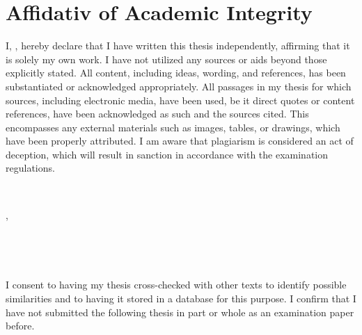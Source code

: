 \chapter*{Affidativ of Academic Integrity}
I, \insertauthor, hereby declare that I have written this thesis independently, affirming that it is solely my own work. I have not utilized any sources or aids beyond those explicitly stated. All content, including ideas, wording, and references, has been substantiated or acknowledged appropriately. All passages in my thesis for which sources, including electronic media, have been used, be it direct quotes or content references, have been acknowledged as such and the sources cited. This encompasses any external materials such as images, tables, or drawings, which have been properly attributed. I am aware that plagiarism is considered an act of deception, which will result in sanction in accordance with the examination regulations.
\par
\vspace{2cm}\
\begin{minipage}[b][][t]{0.5\textwidth}
    \insertplace, \insertdate \par ~
\end{minipage}
\hfill
\begin{minipage}[b][][b]{0.45\textwidth}
    \centering
    \hrulefill
    \par
    \insertauthor
\end{minipage}


\vspace{2cm}\
\par
I consent to having my thesis cross-checked with other texts to identify possible similarities and to having it stored in a database for this purpose.
I confirm that I have not submitted the following thesis in part or whole as an examination paper before.